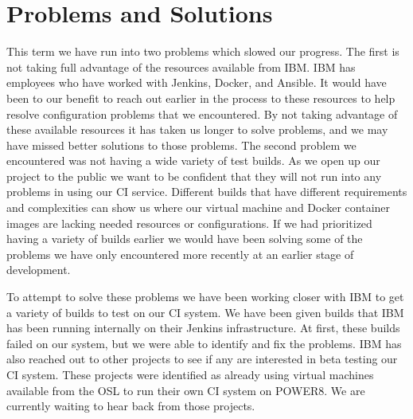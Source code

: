 \documentclass[10pt,onecolumn,journal,draftclsnofoot]{IEEEtran}
\begin{document}
\section{Problems and Solutions}
This term we have run into two problems which slowed our progress.
The first is not taking full advantage of the resources available from IBM\@.
IBM has employees who have worked with Jenkins, Docker, and Ansible.
It would have been to our benefit to reach out earlier in the process to these resources to help resolve configuration problems that we encountered.
By not taking advantage of these available resources it has taken us longer to solve problems, and we may have missed better solutions to those problems.
The second problem we encountered was not having a wide variety of test builds.
As we open up our project to the public we want to be confident that they will not run into any problems in using our CI service.
Different builds that have different requirements and complexities can show us where our virtual machine and Docker container images are lacking needed resources or configurations. 
If we had prioritized having a variety of builds earlier we would have been solving some of the problems we have only encountered more recently at an earlier stage of development.

To attempt to solve these problems we have been working closer with IBM to get a variety of builds to test on our CI system.
We have been given builds that IBM has been running internally on their Jenkins infrastructure.
At first, these builds failed on our system, but we were able to identify and fix the problems.
IBM has also reached out to other projects to see if any are interested in beta testing our CI system.
These projects were identified as already using virtual machines available from the OSL to run their own CI system on POWER8.
We are currently waiting to hear back from those projects.
\end{document}
